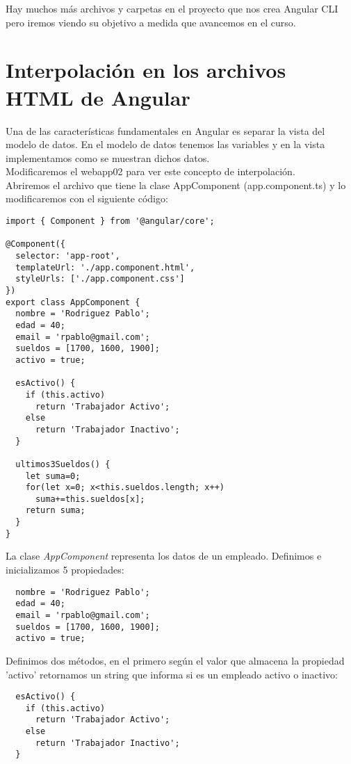 \documentclass[12pt]{book} %
\begin{document}
Hay muchos más archivos y carpetas en el proyecto que nos crea Angular CLI pero iremos viendo su objetivo a medida que avancemos en el curso.

\chapter{Interpolación en los archivos HTML de Angular}
Una de las características fundamentales en Angular es separar la vista del modelo de datos. En el modelo de datos tenemos las variables y en la vista implementamos como se muestran dichos datos.\\

Modificaremos el webapp02 para ver este concepto de interpolación.\\

Abriremos el archivo que tiene la clase AppComponent (app.component.ts) y lo modificaremos con el siguiente código:
\begin{verbatim}
import { Component } from '@angular/core';

@Component({
  selector: 'app-root',
  templateUrl: './app.component.html',
  styleUrls: ['./app.component.css']
})
export class AppComponent {
  nombre = 'Rodriguez Pablo';
  edad = 40;
  email = 'rpablo@gmail.com';
  sueldos = [1700, 1600, 1900];
  activo = true;

  esActivo() {
    if (this.activo)
      return 'Trabajador Activo';
    else
      return 'Trabajador Inactivo';
  }

  ultimos3Sueldos() {
    let suma=0;
    for(let x=0; x<this.sueldos.length; x++)
      suma+=this.sueldos[x];
    return suma;
  }
}
\end{verbatim}

La clase \emph{AppComponent} representa los datos de un empleado. Definimos e inicializamos 5 propiedades:

\begin{verbatim}
  nombre = 'Rodriguez Pablo';
  edad = 40;
  email = 'rpablo@gmail.com';
  sueldos = [1700, 1600, 1900];
  activo = true;
\end{verbatim}

Definimos dos métodos, en el primero según el valor que almacena la propiedad 'activo' retornamos un string que informa si es un empleado activo o inactivo:\\

\begin{verbatim}
  esActivo() {
    if (this.activo)
      return 'Trabajador Activo';
    else
      return 'Trabajador Inactivo';
  }
\end{verbatim}
\end{document}
